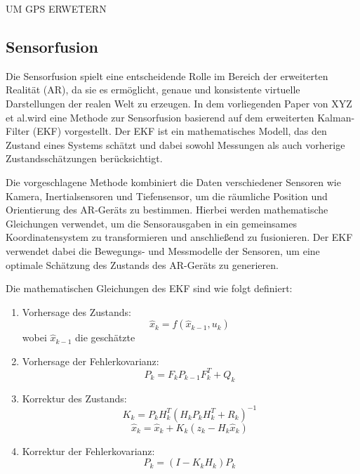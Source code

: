 UM GPS ERWETERN

\subsection{Sensorfusion}
Die Sensorfusion spielt eine entscheidende Rolle im Bereich der erweiterten
Realität (AR), da sie es ermöglicht, genaue und konsistente virtuelle
Darstellungen der realen Welt zu erzeugen. In dem vorliegenden Paper von XYZ et
al.wird eine Methode zur Sensorfusion basierend auf dem erweiterten
Kalman-Filter (EKF) vorgestellt. Der EKF ist ein mathematisches Modell, das den
Zustand eines Systems schätzt und dabei sowohl Messungen als auch vorherige
Zustandsschätzungen berücksichtigt.

Die vorgeschlagene Methode kombiniert die Daten verschiedener Sensoren wie
Kamera, Inertialsensoren und Tiefensensor, um die räumliche Position und
Orientierung des AR-Geräts zu bestimmen. Hierbei werden mathematische
Gleichungen verwendet, um die Sensorausgaben in ein gemeinsames
Koordinatensystem zu transformieren und anschließend zu fusionieren. Der EKF
verwendet dabei die Bewegungs- und Messmodelle der Sensoren, um eine optimale
Schätzung des Zustands des AR-Geräts zu generieren.

Die mathematischen Gleichungen des EKF sind wie folgt definiert:
\begin{enumerate}
      \item Vorhersage des Zustands:
            \begin{equation*}
                  \hat{x}_{k} = f(\hat{x}_{k-1}, u_{k})\
            \end{equation*}
            wobei $\hat{x}_{k-1}$ die geschätzte\\
      \item Vorhersage der Fehlerkovarianz:
            \begin{equation*}
                  P_{k} = F_{k} P_{k-1} F_{k}^T + Q_{k}\
            \end{equation*}

      \item Korrektur des Zustands:
            \begin{equation*}
                  K_{k} = P_{k} H_{k}^T (H_{k} P_{k} H_{k}^T + R_{k})^{-1}\
            \end{equation*}
            \begin{equation*}
                  \hat{x}_{k} = \hat{x}_{k} + K_{k} (z_{k} - H_{k} \hat{x}_{k})\
            \end{equation*}

      \item Korrektur der Fehlerkovarianz:
            \begin{equation*}
                  P_{k} = (I - K_{k} H_{k}) P_{k}\
            \end{equation*}
\end{enumerate}

